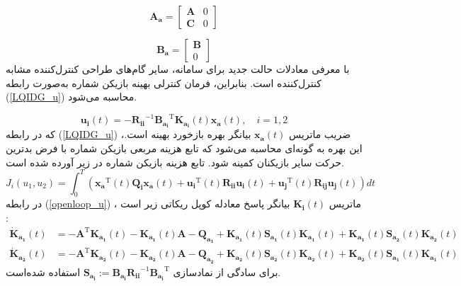  \begin{equation}
	\boldsymbol{A_a} = \begin{bmatrix}
		\boldsymbol{A} &0\\
		\boldsymbol{C} & 0
	\end{bmatrix}
\end{equation}

\begin{equation}
	\boldsymbol{B_a} = \begin{bmatrix}
		\boldsymbol{B}\\
		0
	\end{bmatrix}
\end{equation}
با معرفی معادلات حالت جدید برای سامانه، سایر گام‌های طراحی کنترل‌کننده
 مشابه کنترل‌کننده
است. بنابراین، فرمان کنترلی بهینه  بازیکن شماره  به‌صورت رابطه
(\ref{LQIDG_u})
محاسبه می‌شود.

\begin{equation}\label{LQIDG_u}
	\boldsymbol{u_i}(t) = -\boldsymbol{R_{ii}}^{-1}\boldsymbol{B_{a_i}}^\mathrm{T}\boldsymbol{K_{a_i}}(t)\boldsymbol{x_a}(t),\quad i = 1, 2
\end{equation}
که در رابطه 
(\ref{LQIDG_u})
،ضریب ماتریس $\boldsymbol{x_a}(t)$ بیانگر بهره بازخورد بهینه است. این بهره به گونه‌ای محاسبه می‌شود که تابع هزینه مربعی بازیکن شماره  با فرض بدترین حرکت سایر بازیکنان کمینه شود. تابع هزینه بازیکن شماره  در زیر آورده شده است.
\begin{equation}
	J_i(u_{1}, u_{2}) = \int_{0}^{T}\left( \boldsymbol{x_a} ^\mathrm{T}(t) \boldsymbol{Q_i} \boldsymbol{x_a}(t)+
	\boldsymbol{u_i} ^\mathrm{T}(t) \boldsymbol{R_{ii}} \boldsymbol{u_i}(t)+
	\boldsymbol{u_j} ^\mathrm{T}(t)\boldsymbol{ R_{ij} u_j}(t)
	\right)dt
\end{equation}
در رابطه 
(\ref{openloop_u})
، ماتریس $\boldsymbol{K_{i}}(t)$ بیانگر پاسخ معادله کوپل ریكاتی
زیر است
\cite{diff_game}:
\begin{equation}
	\begin{split}
		\boldsymbol{\dot{K}_{a_1}}(t) &= -\boldsymbol{A}^\mathrm{T}\boldsymbol{K_{a_1}}(t) - \boldsymbol{K_{a_1}}(t)\boldsymbol{A} - \boldsymbol{Q_{a_1}} +\boldsymbol{K_{a_1}}(t)\boldsymbol{S_{a_1}}(t)\boldsymbol{K_{a_1}}(t) + \boldsymbol{K_{a_1}}(t)\boldsymbol{S_{a_2}}(t)\boldsymbol{K_{a_2}}(t)\\
		\boldsymbol{\dot{K}_{a_2}}(t) &= -\boldsymbol{A}^\mathrm{T}\boldsymbol{K_{a_2}}(t) - \boldsymbol{K_{a_2}}(t)\boldsymbol{A} - \boldsymbol{Q_{a_2}} +\boldsymbol{K_{a_2}}(t)\boldsymbol{S_{a_2}}(t)\boldsymbol{K_{a_2}}(t) + \boldsymbol{K_{a_2}}(t)\boldsymbol{S_{a_1}}(t)\boldsymbol{K_{a_1}}(t)
	\end{split}
\end{equation}
برای سادگی از نمادسازی
$\boldsymbol{S_{a_i}} := \boldsymbol{B_{a_i}R_{ii}}^{-1}\boldsymbol{B_{a_i}}^\mathrm{T}$
استفاده شده‌است. 
 
 
 
 